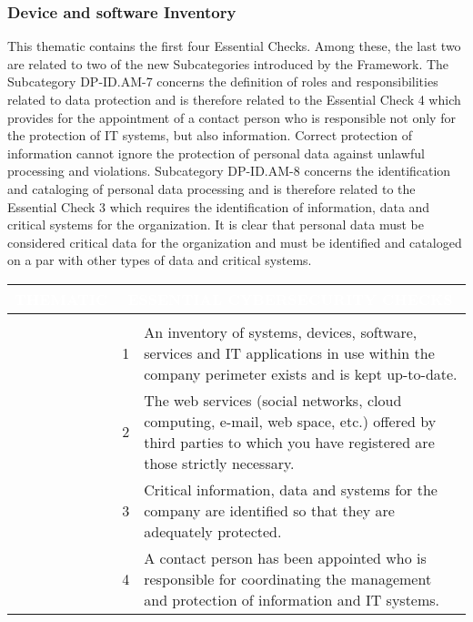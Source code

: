 \subsubsection{Device and software Inventory}
This thematic contains the first four Essential Checks. Among these, the last two are related to two of the new Subcategories introduced by the Framework.
The Subcategory DP-ID.AM-7 concerns the definition of roles and responsibilities related to data protection and is therefore related to the Essential Check 4 which provides for the appointment of a contact person who is responsible not only for the protection of IT systems, but also information. Correct protection of information cannot ignore the protection of personal data against unlawful processing and violations. Subcategory DP-ID.AM-8 concerns the identification and cataloging of personal data processing and is therefore related to the Essential Check 3 which requires the identification of information, data and critical systems for the organization. It is clear that personal data must be considered critical data for the organization and must be identified and cataloged on a par with other types of data and critical systems.
\begin{table}[H]
\begin{tabularx}{\textwidth}{|>{\centering\arraybackslash}p{}|c|X|} 
\hline
{\cellcolor{dummy-cyan}}\textbf{\textcolor{white}{THEMATIC}} &
\multicolumn{2}{|c|}{{\cellcolor{dummy-cyan}}\textbf{\textcolor{white}{ESSENTIAL CYBERSECURITY CHECKS}}}\\ 
\hline
\multirow{10}{*}{\begin{tabular}[c]{@{}c@{}}{Device and software}\\{Inventory}\end{tabular}} & 1 & {An inventory of systems, devices, software, services and IT applications in use within the company perimeter exists and is kept up-to-date.}\\ 
\cline{2-3} & 2 & {The web services (social networks, cloud computing, e-mail, web space, etc.) offered by third parties to which you have registered are those strictly necessary.}\\ 
\cline{2-3} & 3 & {Critical information, data and systems for the company are identified so that they are adequately protected.}\\ 
\cline{2-3} & 4 & {A contact person has been appointed who is responsible for coordinating the management and protection of information and IT systems.}\\ 
\hline
\end{tabularx}
\end{table}
